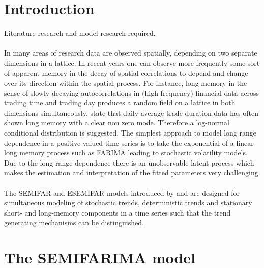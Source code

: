 \documentclass[12pt]{article}
\begin{document}

\section{Introduction}
Literature research and model research required.\\
\\ 
In many areas of research data are observed spatially, depending on two separate dimensions in a lattice. 
In recent years one can observe more frequently some sort of apparent memory in the decay of spatial correlations to depend and change over its direction within the spatial process. 
For instance, long-memory in the sense of slowly decaying autocorrelations in (high frequency) financial data across trading time and trading day produces a random field on a lattice in both dimensions simultaneously. \textcite{beran2015modelling} state that daily average trade duration data has often shown long memory
with a clear non zero mode. Therefore a log-normal conditional distribution is suggested.
The simplest approach to model long range dependence in a positive valued
time series is to take the exponential of a linear long memory process such as
FARIMA leading to stochastic volatility models. Due to the long range dependence
there is an unobservable latent process which makes the estimation and interpretation
of the fitted parameters very challenging.\\
\\
The SEMIFAR and ESEMIFAR models introduced by \textcite{beran2002semifar} and \textcite{beran2015modelling} are designed for simultaneous modeling of stochastic trends, deterministic trends and stationary short- and long-memory components in a time series such that the trend generating mechanisms can be distinguished.

\section{The SEMIFARIMA model}
 
\end{document}
